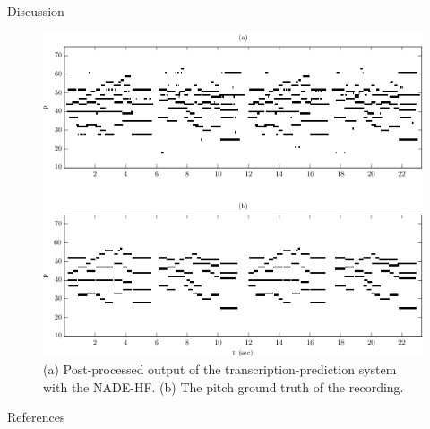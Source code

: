 \documentclass[final]{beamer}
\newlength{\onecolwid}
\begin{document}
\begin{frame}[t]
\begin{columns}[t]
\begin{column}{\onecolwid}
\begin{block}{Discussion}
\begin{figure}
\includegraphics[width=0.9\linewidth]{FigTranscription.png}
\caption{(a) Post-processed output of the transcription-prediction system with the NADE-HF. (b) The pitch ground truth of the recording.}
\end{figure}

\end{block}



\begin{block}{References}

\nocite{*} %
\small{
\vspace{0.75in}}

\end{block}




\end{column} %

\end{columns} %

\end{frame} %
\end{document}
